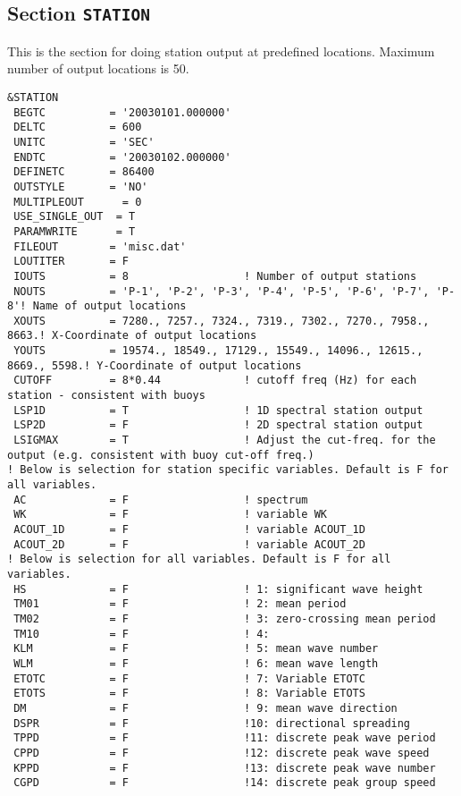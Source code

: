\documentclass[12pt]{amsart}
\begin{document}
\subsection{Section {\tt STATION}}
This is the section for doing station output at predefined locations. Maximum number of output locations is 50.
\begin{verbatim}
&STATION
 BEGTC          = '20030101.000000' 
 DELTC          = 600           
 UNITC          = 'SEC'         
 ENDTC          = '20030102.000000' 
 DEFINETC       = 86400     
 OUTSTYLE       = 'NO'     
 MULTIPLEOUT      = 0       
 USE_SINGLE_OUT  = T       
 PARAMWRITE      = T     
 FILEOUT        = 'misc.dat'
 LOUTITER       = F
 IOUTS          = 8                  ! Number of output stations
 NOUTS          = 'P-1', 'P-2', 'P-3', 'P-4', 'P-5', 'P-6', 'P-7', 'P-8'! Name of output locations
 XOUTS          = 7280., 7257., 7324., 7319., 7302., 7270., 7958., 8663.! X-Coordinate of output locations
 YOUTS          = 19574., 18549., 17129., 15549., 14096., 12615., 8669., 5598.! Y-Coordinate of output locations
 CUTOFF         = 8*0.44             ! cutoff freq (Hz) for each station - consistent with buoys
 LSP1D          = T                  ! 1D spectral station output
 LSP2D          = F                  ! 2D spectral station output
 LSIGMAX        = T                  ! Adjust the cut-freq. for the output (e.g. consistent with buoy cut-off freq.)
! Below is selection for station specific variables. Default is F for all variables.
 AC             = F                  ! spectrum 
 WK             = F                  ! variable WK
 ACOUT_1D       = F                  ! variable ACOUT_1D
 ACOUT_2D       = F                  ! variable ACOUT_2D
! Below is selection for all variables. Default is F for all variables.
 HS             = F                  ! 1: significant wave height
 TM01           = F                  ! 2: mean period
 TM02           = F                  ! 3: zero-crossing mean period
 TM10           = F                  ! 4: 
 KLM            = F                  ! 5: mean wave number
 WLM            = F                  ! 6: mean wave length
 ETOTC          = F                  ! 7: Variable ETOTC
 ETOTS          = F                  ! 8: Variable ETOTS
 DM             = F                  ! 9: mean wave direction
 DSPR           = F                  !10: directional spreading
 TPPD           = F                  !11: discrete peak wave period
 CPPD           = F                  !12: discrete peak wave speed
 KPPD           = F                  !13: discrete peak wave number
 CGPD           = F                  !14: discrete peak group speed

\end{verbatim}
\end{document}

